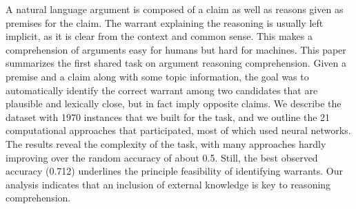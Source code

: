 A natural language argument is composed of a claim as well as reasons given as premises for the claim. The warrant explaining the reasoning is usually left implicit, as it is clear from the context and common sense. This makes a comprehension of arguments easy for humans but hard for machines. This paper summarizes the first shared task on argument reasoning comprehension. Given a premise and a claim along with some topic information, the goal was to automatically identify the correct warrant among two candidates that are plausible and lexically close, but in fact imply opposite claims. We describe the dataset with 1970 instances that we built for the task, and we outline the 21 computational approaches that participated, most of which used neural networks. The results reveal the complexity of the task, with many approaches hardly improving over the random accuracy of about 0.5. Still, the best observed accuracy (0.712) underlines the principle feasibility of identifying warrants. Our analysis indicates that an inclusion of external knowledge is key to reasoning comprehension.
